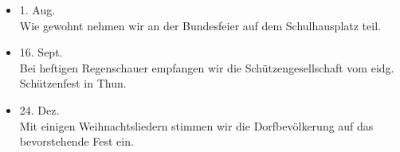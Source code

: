 \begin{history}
\begin{itemize}
        \item 1. Aug.\\
              Wie gewohnt nehmen wir an der Bundesfeier auf dem Schulhausplatz teil.

        \item 16. Sept.\\
              Bei heftigen Regenschauer empfangen wir die Schützengesellschaft vom
              eidg. Schützenfest in Thun.

        \item 24. Dez.\\
              Mit einigen Weihnachtsliedern stimmen wir die Dorfbevölkerung auf das
              bevorstehende Fest ein.


    \end{itemize}

\end{history}
